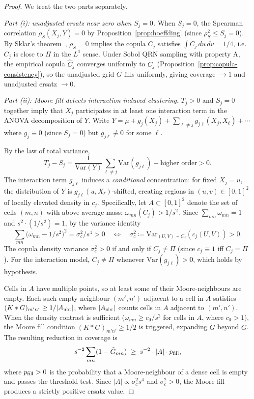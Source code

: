 \documentclass[11pt,a4paper]{article}
\theoremstyle{definition}
\newcommand{\Var}{\mathrm{Var}}
\begin{document}
\begin{proof}
We treat the two parts separately.

\smallskip
\noindent\textit{Part (i): unadjusted ersatz near zero when $S_j = 0$.}
When $S_j = 0$, the Spearman correlation $\rho_S(X_j, Y) = 0$ by
Proposition~\ref{prop:hoeffding} (since $\rho_S^2 \le S_j = 0$).
By Sklar's theorem~\cite{sklar1959}, $\rho_S = 0$ implies the copula $C_j$
satisfies $\int C_j\,du\,dv = 1/4$, i.e.\ $C_j$ is close to $\Pi$ in
the $L^1$ sense.  Under Sobol QRN sampling with property A, the empirical
copula $\hat C_j$ converges uniformly to $C_j$ (Proposition~\ref{prop:copula-consistency}),
so the unadjusted grid $G$ fills uniformly, giving coverage $\to 1$ and
unadjusted ersatz $\to 0$.

\smallskip
\noindent\textit{Part (ii): Moore fill detects interaction-induced clustering.}
$T_j > 0$ and $S_j = 0$ together imply that $X_j$ participates in at least
one interaction term in the ANOVA decomposition of $Y$.  Write
$Y = \mu + g_j(X_j) + \sum_{\ell \ne j} g_{j\ell}(X_j, X_\ell) + \cdots$
where $g_j \equiv 0$ (since $S_j = 0$) but $g_{j\ell} \not\equiv 0$ for
some $\ell$.

By the law of total variance,
\[
  T_j - S_j = \frac{1}{\Var(Y)}\sum_{\ell \ne j}\Var(g_{j\ell}) + \text{higher order} > 0.
\]
The interaction term $g_{j\ell}$ induces a \emph{conditional} concentration:
for fixed $X_j = u$, the distribution of $Y$ is $g_{j\ell}(u, X_\ell)$-shifted,
creating regions in $(u,v) \in [0,1]^2$ of locally elevated density in
$c_j$.  Specifically, let $A \subset [0,1]^2$ denote the set of cells
$(m,n)$ with above-average mass: $\omega_{mn}(C_j) > 1/s^2$.  Since
$\sum_{mn}\omega_{mn} = 1$ and $s^2 \cdot (1/s^2) = 1$, by the variance
identity
\[
  \sum_{mn}\bigl(\omega_{mn} - 1/s^2\bigr)^2
  = \sigma_c^2 / s^4 > 0
  \quad\Longleftrightarrow\quad
  \sigma_c^2 \coloneqq \Var_{(U,V)\sim C_j}(c_j(U,V)) > 0.
\]
The copula density variance $\sigma_c^2 > 0$ if and only if $C_j \ne \Pi$
(since $c_j \equiv 1$ iff $C_j = \Pi$).  For the interaction model,
$C_j \ne \Pi$ whenever $\Var(g_{j\ell}) > 0$, which holds by hypothesis.

Cells in $A$ have multiple points, so at least some of their
Moore-neighbours are empty.  Each such empty neighbour $(m',n')$ adjacent
to a cell in $A$ satisfies $(K * G)_{m'n'} \ge 1/|A_{\rm nbr}|$, where
$|A_{\rm nbr}|$ counts cells in $A$ adjacent to $(m',n')$.  When the
density contrast is sufficient ($\omega_{mn} \ge c_0/s^2$ for cells in $A$,
where $c_0 > 1$), the Moore fill condition $(K * G)_{m'n'} \ge 1/2$ is
triggered, expanding $\tilde G$ beyond $G$.  The resulting reduction in
coverage is
\[
  s^{-2}\sum_{mn}(1 - \tilde G_{mn})
  \;\ge\; s^{-2}\cdot|A| \cdot p_{\rm fill},
\]
where $p_{\rm fill} > 0$ is the probability that a Moore-neighbour of a
dense cell is empty and passes the threshold test.  Since $|A| \propto
\sigma_c^2 s^4$ and $\sigma_c^2 > 0$, the Moore fill produces a strictly
positive ersatz value.
\end{proof}
\end{document}
